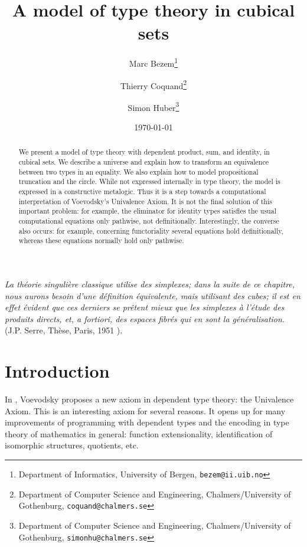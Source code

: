 \documentclass[10pt,a4paper]{article}
\begin{document}
\title{A model of type theory in cubical sets}

\author{
Marc Bezem\thanks{Department of Informatics, University of Bergen, {\tt bezem@ii.uib.no}}
\and
Thierry Coquand\thanks{Department of Computer Science and Engineering, Chalmers/University of Gothenburg, {\tt coquand@chalmers.se}}
\and
Simon Huber\thanks{Department of Computer Science and Engineering, Chalmers/University of Gothenburg, {\tt simonhu@chalmers.se}}
}
\date{\today}
\maketitle


{\em La th\'eorie singuli\`ere classique utilise des {\em simplexes}; dans la suite de ce chapitre,
nous aurons besoin d'une d\'efinition
\'equivalente, mais utilisant des {\em cubes}; il est en effet \'evident que ces derniers se pr\^etent mieux que les
simplexes \`a l'\'etude des produits directs, et, a fortiori, des espaces fibr\'es qui en sont la g\'en\'eralisation.}
(J.P. Serre, Th\`ese, Paris, 1951 \cite{Serre}).


\begin{abstract}\noindent
We present a model of type theory with dependent product, sum, and identity, in cubical sets.
We describe a universe and explain how to transform an equivalence between two types in an equality. 
We also explain how to model propositional truncation and the circle.
While not expressed internally in type theory, the model is expressed in a constructive metalogic.
Thus it is a step towards a computational interpretation of Voevodsky's Univalence Axiom.
It is not the final solution of this important problem: for example, the eliminator for identity types
satisfies the usual computational equations only pathwise, not definitionally.
Interestingly, the converse also occurs: for example, concerning functoriality several equations
hold definitionally, whereas these equations normally hold only pathwise.
\end{abstract}

\section*{Introduction}

In \cite{Voevodsky}, Voevodsky proposes a new axiom in dependent type
theory: the Univalence Axiom. This is an interesting axiom for several
reasons.  It opens up for many improvements of programming with
dependent types and the encoding in type theory of mathematics in
general: function extensionality, identification of isomorphic
structures, quotients, etc.
\end{document}

